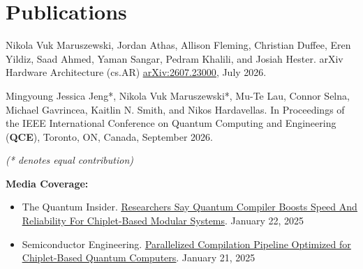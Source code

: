 \section{Publications}

\resumeSubHeadingListStart
\vspace{1pt}


\vspace{6pt}

\hfill\begin{minipage}{\dimexpr\textwidth-24pt}\small
Nikola Vuk Maruszewski, Jordan Athas, Allison Fleming, Christian Duffee, Eren Yildiz, Saad Ahmed,
Yaman Sangar, Pedram Khalili, and Josiah Hester. arXiv Hardware Architecture (cs.AR)
\href{https://arxiv.org/abs/2607.23000}{\ul{arXiv:2607.23000}}, July 2026.
\end{minipage}



\vspace{6pt}

\hfill\begin{minipage}{\dimexpr\textwidth-24pt}\small
Mingyoung Jessica Jeng*, Nikola Vuk Maruszewski*, Mu-Te Lau, Connor Selna, Michael Gavrincea, Kaitlin N. Smith,
and Nikos Hardavellas. In Proceedings of the IEEE International Conference on Quantum Computing and
Engineering (\textbf{QCE}), Toronto, ON, Canada, September 2026.

\vspace{2pt}
\hspace{12pt}\textit{(* denotes equal contribution)}

\vspace{4pt}
\textbf{Media Coverage:}
\begin{itemize}[topsep=0pt,itemsep=0pt]
  \item The Quantum
    Insider. \href{https://thequantuminsider.com/2025/01/22/researchers-say-quantum-compiler-boosts-speed-and-reliability-for-chiplet-based-modular-systems/}{\ul{Researchers
        Say Quantum Compiler Boosts Speed And Reliability For Chiplet-Based Modular Systems}}. January 22, 2025
  \item Semiconductor Engineering. \href{https://semiengineering.com/parallelized-compilation-pipeline-optimized-for-chiplet-based-quantum-computers/}{\ul{Parallelized
      Compilation Pipeline Optimized for Chiplet-Based Quantum Computers}}. January 21, 2025
\end{itemize}
\end{minipage}


